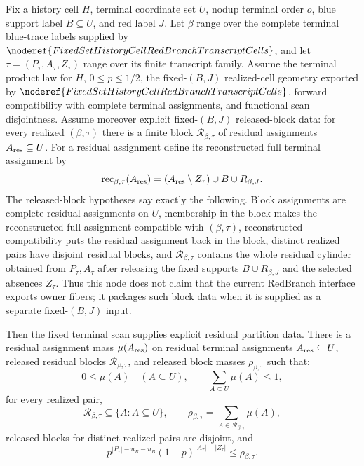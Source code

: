 \begin{helper}
Fix a history cell \(H\), terminal coordinate set \(U\), nodup terminal
order \(o\), blue support label \(B\subseteq U\), and red label \(J\).  Let
\(\beta\) range over the complete terminal blue-trace labels supplied by
\(\noderef{FixedSetHistoryCellRedBranchTranscriptCells}\), and let
\(\tau=(P_\tau,A_\tau,Z_\tau)\) range over its finite transcript family.
Assume the terminal product law for \(H\), \(0\le p\le1/2\), the
fixed-\((B,J)\) realized-cell geometry exported by
\(\noderef{FixedSetHistoryCellRedBranchTranscriptCells}\), forward
compatibility with complete terminal assignments, and functional scan
disjointness.  Assume moreover explicit fixed-\((B,J)\) released-block data:
for every realized \((\beta,\tau)\) there is a finite block
\(\mathcal R_{\beta,\tau}\) of residual assignments \(A_{\rm res}\subseteq
U\).  For a residual assignment define its reconstructed full terminal
assignment by
\[
\operatorname{rec}_{\beta,\tau}(A_{\rm res})
  =(A_{\rm res}\setminus Z_\tau)\cup B\cup R_{\beta,J}.
\]
The released-block hypotheses say exactly the following.  Block assignments
are complete residual assignments on \(U\), membership in the block makes the
reconstructed full assignment compatible with \((\beta,\tau)\), reconstructed
compatibility puts the residual assignment back in the block, distinct
realized pairs have disjoint residual blocks, and
\(\mathcal R_{\beta,\tau}\) contains the whole residual cylinder obtained
from \(P_\tau,A_\tau\) after releasing the fixed supports
\(B\cup R_{\beta,J}\) and the selected absences \(Z_\tau\).  Thus this node
does not claim that the current RedBranch interface exports owner fibers; it
packages such block data when it is supplied as a separate fixed-\((B,J)\)
input.

Then the fixed terminal scan supplies explicit residual partition data.
There is a residual assignment mass \(\mu(A_{\rm res})\) on residual
terminal assignments \(A_{\rm res}\subseteq U\), released residual blocks
\(\mathcal R_{\beta,\tau}\), and released block masses
\(\rho_{\beta,\tau}\) such that:
\[
0\le \mu(A)\quad(A\subseteq U),\qquad
\sum_{A\subseteq U}\mu(A)\le1,
\]
for every realized pair,
\[
\mathcal R_{\beta,\tau}\subseteq\{A:A\subseteq U\},\qquad
\rho_{\beta,\tau}
  =\sum_{A\in\mathcal R_{\beta,\tau}}\mu(A),
\]
released blocks for distinct realized pairs are disjoint, and
\[
p^{|P_\tau|-u_R-u_B}(1-p)^{|A_\tau|-|Z_\tau|}
  \le \rho_{\beta,\tau}.
\]
\end{helper}
